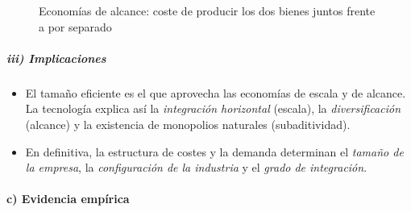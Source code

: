 \documentclass[11pt]{article}
\begin{document}
\begin{figure}[H]
\centering
\caption{Economías de alcance: coste de producir los dos bienes juntos frente a por separado}\label{fig:alcance}
\end{figure}

\subparagraph{iii) Implicaciones}

\begin{itemize}
\item El tamaño eficiente es el que aprovecha las economías de escala y de alcance. La tecnología explica así la \emph{integración horizontal} (escala), la \emph{diversificación} (alcance) y la existencia de monopolios naturales (subaditividad).
\item En definitiva, la estructura de costes y la demanda determinan el \emph{tamaño de la empresa}, la \emph{configuración de la industria} y el \emph{grado de integración}.
\end{itemize}

\paragraph{c) Evidencia empírica}
\end{document}
